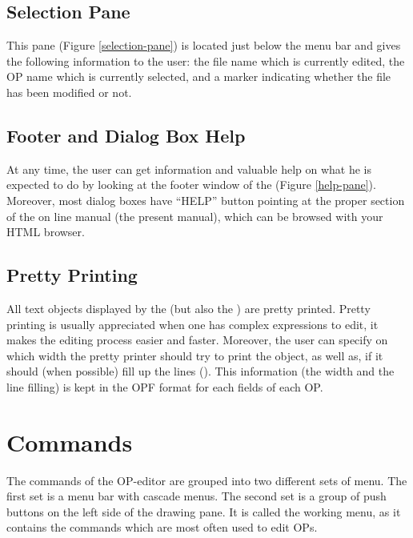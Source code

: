 \section{Selection Pane}


This pane (Figure \ref{selection-pane}) is located just below the menu bar and
gives the following information to the user: the file name which is currently
edited, the OP name which is currently selected, and a marker indicating
whether the file has been modified or not.

\section{Footer and Dialog Box Help}


At any time, the user can get information and valuable help on what he is
expected to do by looking at the footer window of the \OPE{} (Figure
\ref{help-pane}). Moreover, most dialog boxes have ``HELP'' button pointing at
the proper section of the on line manual (the present manual), which can be
browsed with your HTML browser.

\section{Pretty Printing}

All text objects displayed by the \OPE{} (but also the \XPK{}) are pretty
printed. Pretty printing is usually appreciated when one has complex
expressions to edit, it makes the editing process easier and faster.
Moreover, the user can specify on which width the pretty printer
should try to print the object, as well as, if it should (when possible)
fill up the lines (). This information (the width and
the line filling) is kept in the OPF format for each fields of each OP.

\chapter{\OPE{} Commands}

The commands of the OP-editor are grouped into two different sets of menu.  The
first set is a menu bar with cascade menus. The second set is a group of push
buttons on the left side of the drawing pane. It is called the working menu, as
it contains the commands which are most often used to edit OPs.



